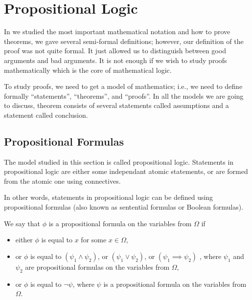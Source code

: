 \chapter{Propositional Logic}
In  we studied the most important
mathematical notation and how to prove theorems, we gave several semi-formal
definitions; however, our definition of the proof was not quite formal. It just
allowed us to distinguish between good arguments and bad arguments. It is not
enough if we wish to study proofs mathematically which is the core of
mathematical logic.

To study proofs, we need to get a model of mathematics; i.e., we need to define formally ``statements'', ``theorems'', and ``proofs''. In all the models we are
going to discuss, theorem consists of several statements called assumptions
and a statement called conclusion.

\section{Propositional Formulas}


The model studied in this section is called propositional logic. Statements in propositional logic are either some independant atomic statements, or
are formed from the atomic one using connectives.

In other words, statements in propositional logic can be defined using
propositional formulas (also known as sentential formulas or Boolean formulas).
\begin{definition}
  We say that $\phi$ is a propositional formula on the variables from
  $\Omega$ if
  \begin{itemize}
    \item either $\phi$ is equal to $x$ for some $x \in \Omega$,
    \item or $\phi$ is equal to $(\psi_1 \land \psi_2)$, or
      $(\psi_1 \lor \psi_2)$, or $(\psi_1 \implies \psi_2)$ ,
      where $\psi_1$ and $\psi_2$ are propositional formulas on the variables
      from $\Omega$,
    \item or $\phi$ is equal to $\lnot \psi$, where $\psi$ is a propositional
      formula on the variables from $\Omega$.
  \end{itemize}
\end{definition}


